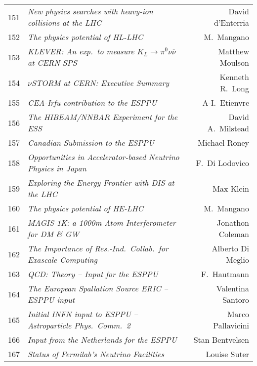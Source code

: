 \begin{flushleft}
\begin{tabular}{llr}
151 & \it New physics searches with heavy-ion collisions at the LHC & David d'Enterria \\
152 & \it The physics potential of HL-LHC & M.\ Mangano \\
153 & \it KLEVER: An exp.\ to measure $K_L\rightarrow \pi^0 \nu \overline{\nu}$ at CERN SPS & Matthew Moulson \\
154 & \it $\nu$STORM at CERN: Executive Summary & Kenneth R.\ Long \\
155 & \it CEA-Irfu contribution to the ESPPU & A-I.\ Etienvre \\
156 & \it The HIBEAM/NNBAR Experiment for the ESS & David A.\  Milstead \\
157 & \it Canadian Submission to the ESPPU & Michael Roney \\
158 & \it Opportunities in Accelerator-based Neutrino Physics in Japan & F.\ Di Lodovico \\
159 & \it Exploring the Energy Frontier with DIS at the LHC & Max Klein \\
160 & \it The physics potential of HE-LHC & M.\ Mangano \\
161 & \it MAGIS-1K: a 1000m Atom Interferometer for DM \& GW & Jonathon Coleman \\
162 & \it The Importance of Res.-Ind.\ Collab.\ for Exascale Computing & Alberto Di Meglio \\
163 & \it QCD: Theory -- Input for the ESPPU & F.\ Hautmann \\
164 & \it The European Spallation Source ERIC -- ESPPU input & Valentina Santoro \\
165 & \it Initial INFN input to ESPPU -- Astroparticle Phys.\ Comm.\ 2 & Marco Pallavicini \\
166 & \it Input from the Netherlands for the ESPPU & Stan Bentvelsen \\
167 & \it Status of Fermilab's Neutrino Facilities & Louise Suter \\ \hline
\end{tabular}
\end{flushleft}

